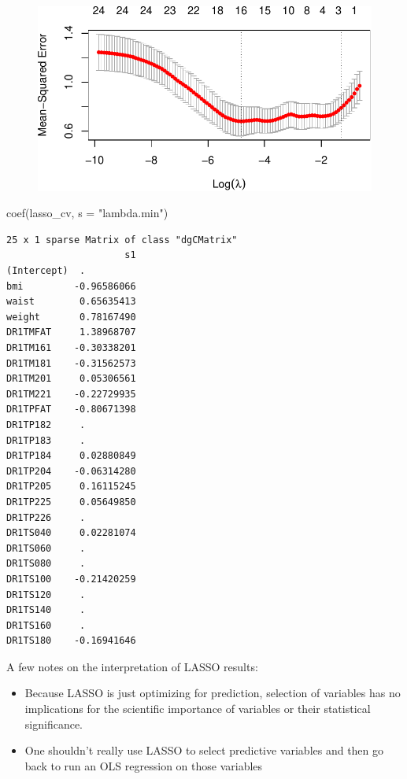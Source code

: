\documentclass[
  letterpaper,
  DIV=11,
  numbers=noendperiod]{scrreport}
\newenvironment{Shaded}{\begin{snugshade}}{\end{snugshade}}
\newcommand{\AttributeTok}[1]{\textcolor[rgb]{0.40,0.45,0.13}{#1}}
\newcommand{\FunctionTok}[1]{\textcolor[rgb]{0.28,0.35,0.67}{#1}}
\newcommand{\NormalTok}[1]{\textcolor[rgb]{0.00,0.23,0.31}{#1}}
\newcommand{\StringTok}[1]{\textcolor[rgb]{0.13,0.47,0.30}{#1}}
\begin{document}
\begin{figure}[H]

{\centering \includegraphics{week5/week5_files/figure-pdf/unnamed-chunk-14-2.pdf}

}

\end{figure}

\begin{Shaded}
\begin{Highlighting}[]
\FunctionTok{coef}\NormalTok{(lasso\_cv, }\AttributeTok{s =} \StringTok{"lambda.min"}\NormalTok{)}
\end{Highlighting}
\end{Shaded}

\begin{verbatim}
25 x 1 sparse Matrix of class "dgCMatrix"
                     s1
(Intercept)  .         
bmi         -0.96586066
waist        0.65635413
weight       0.78167490
DR1TMFAT     1.38968707
DR1TM161    -0.30338201
DR1TM181    -0.31562573
DR1TM201     0.05306561
DR1TM221    -0.22729935
DR1TPFAT    -0.80671398
DR1TP182     .         
DR1TP183     .         
DR1TP184     0.02880849
DR1TP204    -0.06314280
DR1TP205     0.16115245
DR1TP225     0.05649850
DR1TP226     .         
DR1TS040     0.02281074
DR1TS060     .         
DR1TS080     .         
DR1TS100    -0.21420259
DR1TS120     .         
DR1TS140     .         
DR1TS160     .         
DR1TS180    -0.16941646
\end{verbatim}

A few notes on the interpretation of LASSO results:

\begin{itemize}
\item
  Because LASSO is just optimizing for prediction, selection of
  variables has no implications for the scientific importance of
  variables or their statistical significance.
\item
  One shouldn't really use LASSO to select predictive variables and then
  go back to run an OLS regression on those variables
\end{itemize}
\end{document}

